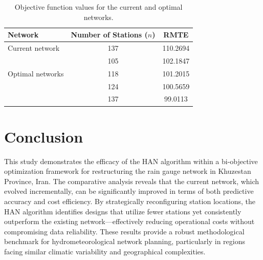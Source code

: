 \documentclass[10pt,twoside]{article}
\numberwithin{equation}{section}
\begin{document}
\begin{table}[!ht]

\begin{center}

	\caption{Objective function values for the current and optimal networks.}\label{tab:results}

\scriptsize

\begin{tabular}{lcc}

  \hline

  Network & Number of Stations ($n$) & RMTE \\ \hline

  Current network & 137 & 110.2694 \\ [3mm]

   & 105 & 102.1847 \\

  Optimal networks & 118 & 101.2015 \\

   & 124 & 100.5659 \\

   & 137 & 99.0113 \\ \hline

\end{tabular}

\end{center}

\end{table}



 \vspace*{-20mm}

\section*{Conclusion}

This study demonstrates the efficacy of the HAN algorithm within a bi-objective optimization framework for restructuring the rain gauge network in Khuzestan Province, Iran. The comparative analysis reveals that the current network, which evolved incrementally, can be significantly improved in terms of both predictive accuracy and cost efficiency. By strategically reconfiguring station locations, the HAN algorithm identifies designs that utilize fewer stations yet consistently outperform the existing network—effectively reducing operational costs without compromising data reliability. These results provide a robust methodological benchmark for hydrometeorological network planning, particularly in regions facing similar climatic variability and geographical complexities.
\end{document}
